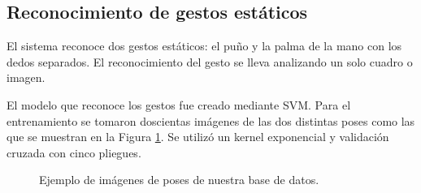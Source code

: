 \subsection{Reconocimiento de gestos estáticos}\label{RecognitionEstatic}

El sistema reconoce dos gestos estáticos: el puño y la palma de la mano con los dedos separados. El reconocimiento del gesto se lleva analizando un solo cuadro o imagen.  

El modelo que reconoce los gestos fue creado mediante SVM. Para el entrenamiento se tomaron doscientas imágenes de las dos distintas poses como las que se muestran en la Figura \ref{fig:SVMTrainingStatic}. Se utiliz\'o un kernel exponencial y validación cruzada con cinco pliegues.   

\begin{figure}[h!]
\begin{center}
      \quad
{}
\end{center}
\caption{Ejemplo de imágenes de poses de nuestra base de datos.}
\label{fig:SVMTrainingStatic}
\end{figure}


